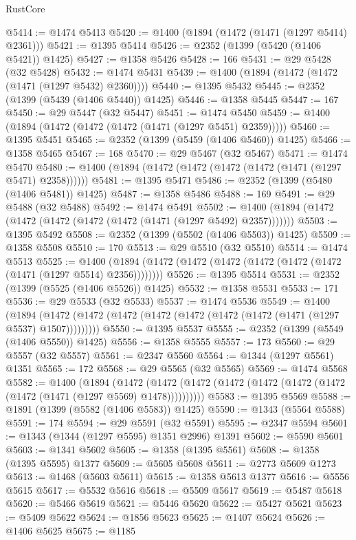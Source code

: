 \begin{lexlean}{RustCore}
\begin{coremodule}
{\begin{coremodule}
{{{{{{{{{{{{{{{{{{{{{{{{{{{{{{{{{{{{{{{{{{{{@5414 := @1474 @5413
@5420 := @1400 (@1894 (@1472 (@1471 (@1297 @5414) @2361)))
@5421 := @1395 @5414
@5426 := @2352 (@1399 (@5420 (@1406 @5421)) @1425)
@5427 := @1358 @5426
@5428 := 166
@5431 := @29 @5428 (@32 @5428)
@5432 := @1474 @5431
@5439 := @1400 (@1894 (@1472 (@1472 (@1471 (@1297 @5432) @2360))))
@5440 := @1395 @5432
@5445 := @2352 (@1399 (@5439 (@1406 @5440)) @1425)
@5446 := @1358 @5445
@5447 := 167
@5450 := @29 @5447 (@32 @5447)
@5451 := @1474 @5450
@5459 := @1400 (@1894 (@1472 (@1472 (@1472 (@1471 (@1297 @5451) @2359)))))
@5460 := @1395 @5451
@5465 := @2352 (@1399 (@5459 (@1406 @5460)) @1425)
@5466 := @1358 @5465
@5467 := 168
@5470 := @29 @5467 (@32 @5467)
@5471 := @1474 @5470
@5480 := @1400 (@1894 (@1472 (@1472 (@1472 (@1472 (@1471 (@1297 @5471) @2358))))))
@5481 := @1395 @5471
@5486 := @2352 (@1399 (@5480 (@1406 @5481)) @1425)
@5487 := @1358 @5486
@5488 := 169
@5491 := @29 @5488 (@32 @5488)
@5492 := @1474 @5491
@5502 := @1400 (@1894 (@1472 (@1472 (@1472 (@1472 (@1472 (@1471 (@1297 @5492) @2357)))))))
@5503 := @1395 @5492
@5508 := @2352 (@1399 (@5502 (@1406 @5503)) @1425)
@5509 := @1358 @5508
@5510 := 170
@5513 := @29 @5510 (@32 @5510)
@5514 := @1474 @5513
@5525 := @1400 (@1894 (@1472 (@1472 (@1472 (@1472 (@1472 (@1472 (@1471 (@1297 @5514) @2356))))))))
@5526 := @1395 @5514
@5531 := @2352 (@1399 (@5525 (@1406 @5526)) @1425)
@5532 := @1358 @5531
@5533 := 171
@5536 := @29 @5533 (@32 @5533)
@5537 := @1474 @5536
@5549 := @1400
    (@1894 (@1472 (@1472 (@1472 (@1472 (@1472 (@1472 (@1472 (@1471 (@1297 @5537) @1507)))))))))
@5550 := @1395 @5537
@5555 := @2352 (@1399 (@5549 (@1406 @5550)) @1425)
@5556 := @1358 @5555
@5557 := 173
@5560 := @29 @5557 (@32 @5557)
@5561 := @2347 @5560
@5564 := @1344 (@1297 @5561) @1351
@5565 := 172
@5568 := @29 @5565 (@32 @5565)
@5569 := @1474 @5568
@5582 := @1400
    (@1894
      (@1472 (@1472 (@1472 (@1472 (@1472 (@1472 (@1472 (@1472 (@1471 (@1297 @5569) @1478))))))))))
@5583 := @1395 @5569
@5588 := @1891 (@1399 (@5582 (@1406 @5583)) @1425)
@5590 := @1343 (@5564 @5588)
@5591 := 174
@5594 := @29 @5591 (@32 @5591)
@5595 := @2347 @5594
@5601 := @1343 (@1344 (@1297 @5595) @1351 @2996) @1391
@5602 := @5590 @5601
@5603 := @1341 @5602
@5605 := @1358 (@1395 @5561)
@5608 := @1358 (@1395 @5595) @1377
@5609 := @5605 @5608
@5611 := @2773 @5609 @1273
@5613 := @1468 (@5603 @5611)
@5615 := @1358 @5613 @1377
@5616 := @5556 @5615
@5617 := @5532 @5616
@5618 := @5509 @5617
@5619 := @5487 @5618
@5620 := @5466 @5619
@5621 := @5446 @5620
@5622 := @5427 @5621
@5623 := @5409 @5622
@5624 := @1856 @5623
@5625 := @1407 @5624
@5626 := @1406 @5625
@5675 := @1185
}}}}}}}}}}}}}}}}}}}}}}}}}}}}}}}}}}}}}}}}}}}}
\end{coremodule}}
\end{coremodule}
\end{lexlean}
